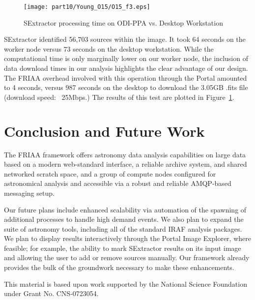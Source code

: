 \begin{figure}[ht]
\texttt{[image: part10/Young\_O15/O15\_f3.eps]}
\caption{SExtractor processing time on ODI-PPA vs. Desktop Workstation}
\label{fig:sex_run}
\end{figure}

SExtractor identified 56,703 sources within the image. It took 64 seconds on the worker node versus 73 seconds on the desktop workstation.  While the computational time is only marginally lower on our worker node, the inclusion of data download times in our analysis highlights the clear advantage of our design.  The FRIAA overhead involved with this operation through the Portal amounted to 4 seconds, versus 987 seconds on the desktop to download the 3.05GB .fits file (download speed: ~25Mbps.)  The results of this test are plotted in Figure~\ref{fig:sex_run}.

\section{Conclusion and Future Work}

The FRIAA framework offers astronomy data analysis capabilities on large data based on a modern web-standard interface, a reliable archive system, and shared networked scratch space, and a group of compute nodes configured for astronomical analysis and accessible via a robust and reliable AMQP-based messaging setup. 

Our future plans include enhanced scalability via automation of the spawning of additional processes to handle high demand events.  We also plan to expand the suite of astronomy tools, including all of the standard IRAF analysis packages.  We plan to display results interactively through the Portal Image Explorer, where feasible; for example, the ability to mark SExtractor results on its input image and allowing the user to add or remove sources manually.  Our framework already provides the bulk of the groundwork necessary to make these enhancements.  

 
\acknowledgements 
This material is based upon work supported by the National Science Foundation under Grant No. CNS-0723054.  


  

